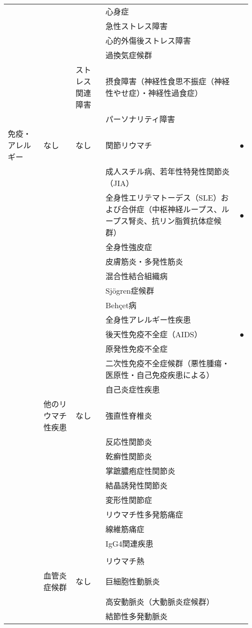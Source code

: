 \begin{xltabular}{\linewidth}{XXXXX}
 &  &  & 心身症 &  \\
 &  &  & 急性ストレス障害 &  \\
 &  &  & 心的外傷後ストレス障害 &  \\
 &  &  & 過換気症候群 &  \\
 &  & ストレス関連障害 & 摂食障害（神経性食思不振症（神経性やせ症）・神経性過食症） &  \\
 &  &  & パーソナリティ障害 &  \\
免疫・アレルギー & なし & なし & 関節リウマチ & ● \\
 &  &  & 成人スチル病、若年性特発性関節炎（JIA） &  \\
 &  &  & 全身性エリテマトーデス（SLE）および合併症（中枢神経ループス、ループス腎炎、抗リン脂質抗体症候群） & ● \\
 &  &  & 全身性強皮症 &  \\
 &  &  & 皮膚筋炎・多発性筋炎 &  \\
 &  &  & 混合性結合組織病 &  \\
 &  &  & Sjögren症候群 &  \\
 &  &  & Behçet病 &  \\
 &  &  & 全身性アレルギー性疾患 &  \\
 &  &  & 後天性免疫不全症（AIDS） & ● \\
 &  &  & 原発性免疫不全症 &  \\
 &  &  & 二次性免疫不全症候群（悪性腫瘍・医原性・自己免疫疾患による） &  \\
 &  &  & 自己炎症性疾患 &  \\
 & 他のリウマチ性疾患 & なし & 強直性脊椎炎 &  \\
 &  &  & 反応性関節炎 &  \\
 &  &  & 乾癬性関節炎 &  \\
 &  &  & 掌蹠膿疱症性関節炎 &  \\
 &  &  & 結晶誘発性関節炎 &  \\
 &  &  & 変形性関節症 &  \\
 &  &  & リウマチ性多発筋痛症 &  \\
 &  &  & 線維筋痛症 &  \\
 &  &  & IgG4関連疾患 &  \\
 &  &  &  &  \\
 &  &  & リウマチ熱 &  \\
 & 血管炎症候群 & なし & 巨細胞性動脈炎 &  \\
 &  &  & 高安動脈炎（大動脈炎症候群） &  \\
 &  &  & 結節性多発動脈炎 &  \\

\end{xltabular}
